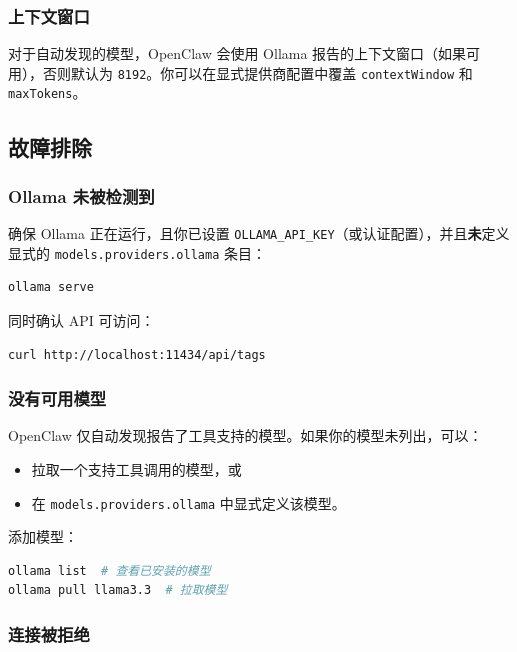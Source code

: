 \subsubsection{上下文窗口}


对于自动发现的模型，OpenClaw 会使用 Ollama 报告的上下文窗口（如果可用），否则默认为 \texttt{8192}。你可以在显式提供商配置中覆盖 \texttt{contextWindow} 和 \texttt{maxTokens}。

\subsection{故障排除}


\subsubsection{Ollama 未被检测到}


确保 Ollama 正在运行，且你已设置 \texttt{OLLAMA\_API\_KEY}（或认证配置），并且\textbf{未}定义显式的 \texttt{models.providers.ollama} 条目：

\begin{lstlisting}[language=bash]
ollama serve
\end{lstlisting}


同时确认 API 可访问：

\begin{lstlisting}[language=bash]
curl http://localhost:11434/api/tags
\end{lstlisting}


\subsubsection{没有可用模型}


OpenClaw 仅自动发现报告了工具支持的模型。如果你的模型未列出，可以：

\begin{itemize}
  \item 拉取一个支持工具调用的模型，或
  \item 在 \texttt{models.providers.ollama} 中显式定义该模型。
\end{itemize}


添加模型：

\begin{lstlisting}[language=bash]
ollama list  # 查看已安装的模型
ollama pull llama3.3  # 拉取模型
\end{lstlisting}


\subsubsection{连接被拒绝}


